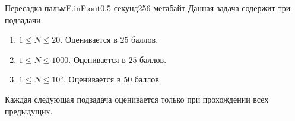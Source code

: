 \begin{problem}{Пересадка пальм}{F.in}{F.out}{0.5 секунд}{256 мегабайт}
\Scoring
Данная задача содержит три подзадачи:
\begin{enumerate}
\item $1 \le N \le 20$. Оценивается в $25$ баллов.
\item $1 \le N \le 1000$. Оценивается в $25$ баллов.
\item $1 \le N \le 10^5$. Оценивается в $50$ баллов.
\end{enumerate}

Каждая следующая подзадача оценивается только при прохождении всех предыдущих.

\end{problem}
